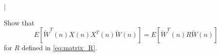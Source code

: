 |\documentclass[journal,12pt,twocolumn]{IEEEtran}
\begin{document}
\begin{problem}
Show that 
\begin{equation}
E[\tilde W^{T}(n)X(n) X^{T}(n) \tilde W(n)] = E[\tilde W^{T}(n) R \tilde W(n)]
\end{equation}
%
for $R$ defined in \eqref{eq:matrix_R}.
\end{problem}
\end{document}
